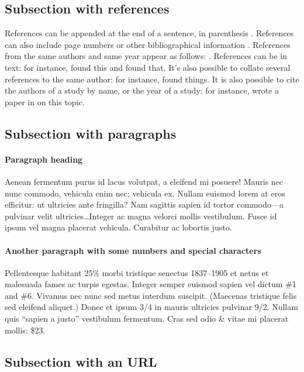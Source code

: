 \documentclass[letterpaper,11pt,leqno]{article}
\begin{document}
\subsection{Subsection with references} 

References can be appended at the end of a sentence, in parenthesis \citep{MS15}. References can also include page numbers or other bibliographical information \citep[p. 1305]{MS19}. References from the same authors and same year appear as follows: \citep{LMS18a,LMS18b}. References can be in text: for instance, \citet{M12} found this and \citet[figure 1]{M14} found that. It's also possible to collate several references to the same author: for instance, \citet{M12,M14} found things. It is also possible to cite the authors of a study by name, or the year of a study: for instance, \citeauthor{EMM21} wrote a paper in \citeyear{EMM21} on this topic.

\subsection{Subsection with paragraphs}

\paragraph{Paragraph heading} Aenean fermentum purus id lacus volutpat, a eleifend mi posuere! Mauris nec nunc commodo, vehicula enim nec; vehicula ex. Nullam euismod lorem at eros efficitur: ut ultricies ante fringilla? Nam sagittis sapien id tortor commodo---a pulvinar velit ultricies\ldots Integer ac magna velorci mollis vestibulum. Fusce id ipsum vel magna placerat vehicula. Curabitur ac lobortis justo. 

\paragraph{Another paragraph with some numbers and special characters} Pellentesque habitant 25\% morbi tristique senectus 1837--1905 et netus et malesuada fames ac turpis egestas. Integer semper euismod sapien vel dictum \#1 and \#6. Vivamus nec nunc sed metus interdum suscipit. (Maecenas tristique felis sed eleifend aliquet.) Donec et ipsum 3/4 in mauris ultricies pulvinar 9/2. Nullam quis ``sapien a justo'' vestibulum fermentum. Cras sed odio \& vitae mi placerat mollis: \$23.

\subsection{Subsection with an URL}
\end{document}
